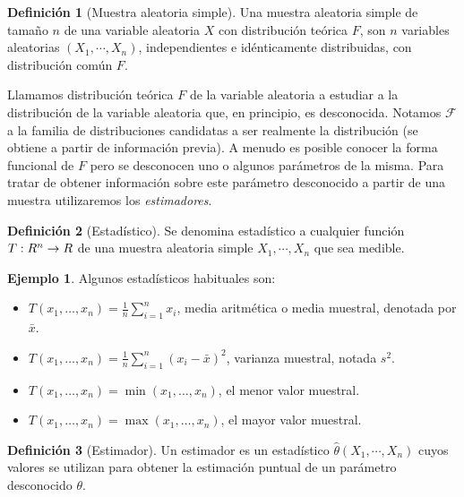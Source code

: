 \documentclass[10pt,a4paper]{article} %
\let\mathbb\relax
\theoremstyle{definition}
\newtheorem{definition}{Definición}[section]
\newtheorem{example}[theorem]{Ejemplo}
\begin{document}
\begin{definition}[Muestra aleatoria simple]
  Una muestra aleatoria simple de tamaño $n$ de una variable aleatoria $X$ con distribución teórica $F$, son $n$ variables aleatorias $(X_1,\cdots,X_n)$, independientes e idénticamente distribuidas, con distribución común $F$.
\end{definition}

Llamamos distribución teórica $F$ de la variable aleatoria a estudiar a la distribución de la variable aleatoria que, en principio, es desconocida. Notamos $\mathcal{F}$ a la familia de distribuciones candidatas a ser realmente la distribución (se obtiene a partir de información previa). A menudo es posible conocer la forma funcional de $F$ pero se desconocen uno o algunos parámetros de la misma. Para tratar de obtener información sobre este parámetro desconocido a partir de una muestra utilizaremos los \textit{estimadores}.

\begin{definition}[Estadístico]
  Se denomina estadístico a cualquier función $T:\mathbb{R}^n\to \mathbb{R}$ de una muestra aleatoria simple $X_1,\cdots,X_n$  que sea medible.
\end{definition}

\begin{example}
  Algunos estadísticos habituales son:

  \begin{itemize}
  \item $T(x_1,\dots,x_n) = \frac{1}{n}\sum_{i=1}^nx_i$, media aritmética o media muestral, denotada por $\bar{x}$.
  \item $T(x_1,\dots,x_n) = \frac{1}{n}\sum_{i=1}^n(x_i-\bar{x})^2$, varianza muestral, notada $s^2$.
  \item $T(x_1,\dots,x_n) = \min (x_1,\dots,x_n)$, el menor valor muestral.
  \item $T(x_1,\dots,x_n) = \max (x_1,\dots,x_n)$, el mayor valor muestral.
  \end{itemize}
\end{example}

\begin{definition}[Estimador]
Un estimador es un estadístico $\widehat{\theta}(X_1,\cdots,X_n)$ cuyos valores se utilizan para obtener la estimación puntual de un parámetro desconocido $\theta$.
\end{definition}
\end{document}
